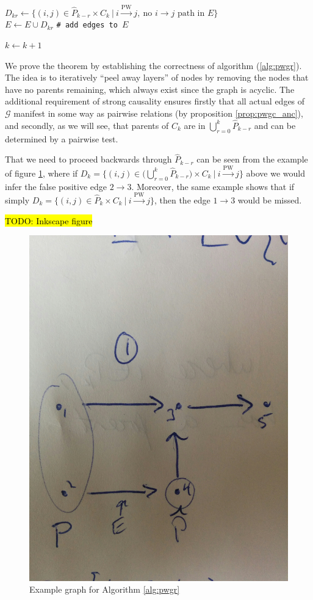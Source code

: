 \documentclass[12pt]{article}
\def\pwgc{\overset{\text{PW}}{\rightarrow}}  %
\def\gcg{\mathcal{G}}  %
\begin{document}
\begin{theorem}
\begin{algorithm}
{      
      {
        $D_{kr} \leftarrow \{(i, j) \in \widehat{P}_{k - r} \times C_k\ |\ i \pwgc j,\ \text{no } i \rightarrow j \text{ path in } E \}$\\%
        $E \leftarrow E \cup D_{kr}$ \texttt{\# add edges to }$E$\\
      }

      \;
      $k \leftarrow k + 1$
    }
  \end{algorithm}
\end{theorem}

We prove the theorem by establishing the correctness of algorithm (\ref{alg:pwgr}).  The idea is to iteratively ``peel away layers'' of nodes by removing the nodes that have no parents remaining, which always exist since the graph is acyclic.  The additional requirement of strong causality ensures firstly that all actual edges of $\gcg$ manifest in some way as pairwise relations (by proposition \ref{prop:pwgc_anc}), and secondly, as we will see, that parents of $C_k$ are in $\bigcup_{r = 0}^k\widehat{P}_{k - r}$ and can be determined by a pairwise test.

\begin{example}
  That we need to proceed backwards through $\widehat{P}_{k - r}$ can be seen from the example of figure \ref{fig:example_fig3}, where if $D_k = \{(i, j) \in \Big(\bigcup_{r = 0}^k \widehat{P}_{k - r}\Big) \times C_k\ |\ i \pwgc j \}$ above we would infer the false positive edge $2 \rightarrow 3$.  Moreover, the same example shows that if simply $D_k = \{(i, j) \in \widehat{P}_k \times C_k\ |\ i \pwgc j \}$, then the edge $1 \rightarrow 3$ would be missed.

\hl{TODO: Inkscape figure}

  \begin{figure}
    \centering
    \label{fig:example_fig3}
    \caption{Example graph for Algorithm \ref{alg:pwgr}}
    \includegraphics[width=0.5\linewidth]{hand_drawn_example3.jpg}
  \end{figure}
\end{example}
\end{document}
